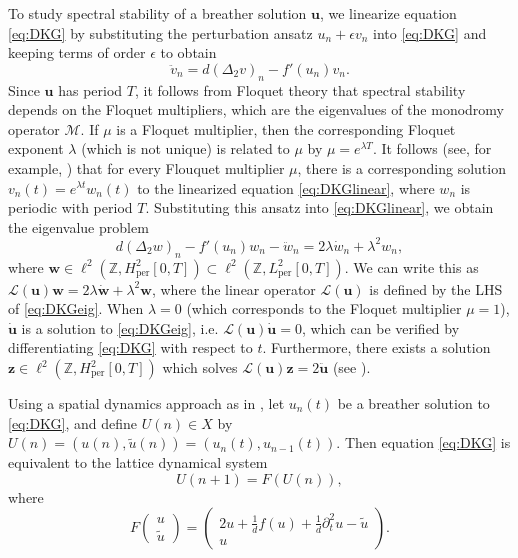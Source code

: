 \documentclass[12pt,reqno]{amsart}
\def\Z{{\mathbb Z}}
\def\per{\textrm{per}}
\def\calL{\mathcal{L}}
\newcommand{\uvec}{\mathbf{u}}
\newcommand{\wvec}{\mathbf{w}}
\newcommand{\zvec}{\mathbf{z}}
\begin{document}
To study spectral stability of a breather solution $\uvec$, we linearize equation \cref{eq:DKG} by substituting the perturbation ansatz $u_n + \epsilon v_n$ into \cref{eq:DKG} and keeping terms of order $\epsilon$ to obtain
\begin{equation}\label{eq:DKGlinear}
\ddot{v}_n = d (\Delta_2 v)_n - f'(u_n)v_n.
\end{equation}
Since $\uvec$ has period $T$, it follows from Floquet theory that spectral stability depends on the Floquet multipliers, which are the eigenvalues of the monodromy operator $\mathcal{M}$. If $\mu$ is a Floquet multiplier, then the corresponding Floquet exponent $\lambda$ (which is not unique) is related to $\mu$ by $\mu = e^{\lambda T}$. It follows (see, for example, \cite[Lemma 2.1.29]{Kapitula2013}) that for every Flouquet multiplier $\mu$, there is a corresponding solution $v_n(t) = e^{\lambda t} w_n(t)$ to the linearized equation \cref{eq:DKGlinear}, where $w_n$ is periodic with period $T$. Substituting this ansatz into \cref{eq:DKGlinear}, we obtain the eigenvalue problem
\begin{equation}\label{eq:DKGeig}
d (\Delta_2 w)_n - f'(u_n)w_n - \ddot{w}_n = 2 \lambda \dot{w}_n + \lambda^2 w_n,
\end{equation}
where $\wvec \in \ell^2(\Z, H^2_\per[0,T]) \subset \ell^2(\Z, L^2_\per[0,T])$. We can write this as $\calL(\uvec)\wvec = 2 \lambda \dot{\wvec} + \lambda^2 \wvec$, where the linear operator $\calL(\uvec)$ is defined by the LHS of \cref{eq:DKGeig}. When $\lambda = 0$ (which corresponds to the Floquet multiplier $\mu = 1$), $\dot{\uvec}$ is a solution to \cref{eq:DKGeig}, i.e. $\calL(\uvec)\dot{\uvec}=0$, which can be verified by differentiating \cref{eq:DKG} with respect to $t$. Furthermore, there exists a solution $\zvec \in \ell^2(\Z, H^2_\per[0,T])$ which solves $\calL(\uvec)\zvec = 2 \ddot{\uvec}$ (see \cite[Section 3]{Pelinovsky2012}).

Using a spatial dynamics approach as in \cites{Parker2020,Parker2021}, let $u_n(t)$ be a breather solution to \cref{eq:DKG}, and define $U(n) \in X$ by $U(n) = (u(n), \tilde{u}(n)) = (u_n(t), u_{n-1}(t) )$. Then equation \cref{eq:DKG} is equivalent to the lattice dynamical system
\begin{equation}\label{eq:dynEq}
U(n+1) = F(U(n)),
\end{equation}
where
\begin{equation}\label{eq:F}
F\begin{pmatrix}u \\ \tilde{u} \end{pmatrix} = 
\begin{pmatrix}2u  + \frac{1}{d}f(u) + \frac{1}{d} \partial_t^2 u - \tilde{u} \\
u
\end{pmatrix}.
\end{equation}
\end{document}

